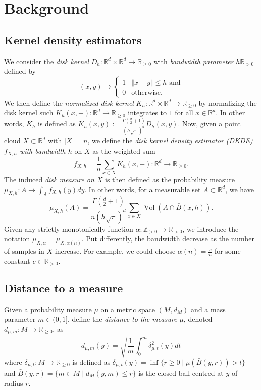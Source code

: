 \documentclass[10pt,a4paper]{article}
\theoremstyle{definition}
\newcommand{\R}{\mathbb{R}}
\begin{document}
	\section{Background}
	\subsection{Kernel density estimators}
	We consider the \textit{disk kernel} $D_h\colon\R^d\times\R^d\to\R_{\geq0}$ with \textit{bandwidth parameter} $h\R_{>0}$ defined by
	$$
	(x,y)\mapsto 
	\begin{cases} 
		1 & \Vert x - y\Vert \leq h\text{ and} \\
		0 & \text{otherwise.}
	\end{cases}
	$$
	We then define the \textit{normalized disk kernel} $K_h\colon\R^d\times\R^d\to\R_{\geq0}$ by normalizing the disk kernel such $K_h(x,-)\colon\R^d\to\R_{\geq0}$ integrates to $1$ for all $x\in\R^d$. In other words, $K_h$ is defined as $K_h(x,y):=\frac{\Gamma(\frac{d}{2}+1)}{(h\sqrt{\pi})^d}D_h(x,y)$. Now, given a point cloud $X\subset\R^d$ with $|X|=n$, we define the \textit{disk kernel density estimator (DKDE) $f_{X,h}$ with bandwidth $h$} on $X$ as the weighted sum
	$$
	f_{X,h} = \frac{1}{n}\sum_{x\in X}K_h(x,-)\colon\R^d\to\R_{\geq0}.
	$$
	The induced \textit{disk measure on $X$} is then defined as the probability measure $\mu_{X,h}\colon A\to\int_A f_{X,h}(y)dy$. In other words, for a measurable set $A\subset\R^d$, we have
	$$
	\mu_{X,h}(A) = \frac{\Gamma(\frac{d}{2}+1)}{n(h\sqrt{\pi})^d}\sum_{x\in X}\operatorname{Vol}(A\cap\bar{B}(x,h)).
	$$
	Given any strictly monotonically function $\alpha\colon\mathbb{Z}_{>0}\to\R_{>0}$, we introduce the notation $\mu_{X,\alpha} = \mu_{X,\alpha(n)}$. Put differently, the bandwidth decrease as the number of samples in $X$ increase. For example, we could choose $\alpha(n)=\frac{c}{n}$ for some constant $c\in\R_{>0}$.
	
	\subsection{Distance to a measure}
	Given a probability measure $\mu$ on a metric space $(M,d_M)$ and a mass parameter $m\in(0,1]$, define the \textit{distance to the measure $\mu$}, denoted $d_{\mu,m}\colon M\to\R_{\geq0}$, as
	$$
	d_{\mu,m}(y) = \sqrt{\frac{1}{m}\int_0^m\delta_{\mu, t}^2(y)dt}
	$$
	where $\delta_{\mu,t}\colon M\to\R_{\geq0}$ is defined as $\delta_{\mu,t}(y)=\inf\{r\geq0\mid\mu(\bar{B}(y,r))>t\}$ and $\bar{B}(y,r)=\{m\in M\mid d_M(y,m)\leq r\}$ is the closed ball centred at $y$ of radius $r$.
	
\end{document}
